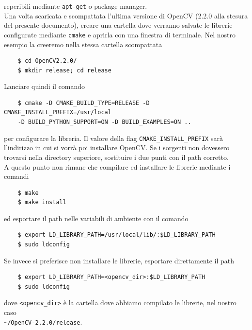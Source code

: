 \documentclass[12pt]{report}
\begin{document}
\noindent reperibili mediante \verb|apt-get| o package manager.\\

\noindent Una volta scaricata e scompattata l'ultima versione di OpenCV (2.2.0 alla stesura del presente documento), creare una cartella dove verranno salvate le librerie configurate mediante \verb|cmake| e aprirla con una finestra di terminale. Nel nostro esempio la creeremo nella stessa cartella scompattata

\begin{verbatim}
	$ cd OpenCV2.2.0/
	$ mkdir release; cd release
\end{verbatim}

\noindent Lanciare quindi il comando

\begin{verbatim}
	$ cmake -D CMAKE_BUILD_TYPE=RELEASE -D CMAKE_INSTALL_PREFIX=/usr/local
	-D BUILD_PYTHON_SUPPORT=ON -D BUILD_EXAMPLES=ON ..
\end{verbatim}

\noindent per configurare la libreria. Il valore della flag \verb|CMAKE_INSTALL_PREFIX| sar\`a l'indirizzo in cui si vorr\`a poi installare OpenCV. Se i sorgenti non dovessero trovarsi nella directory superiore, sostituire i due punti con il path corretto.\\

\noindent A questo punto non rimane che compilare ed installare le librerie mediante i comandi

\begin{verbatim}
	$ make
	$ make install
\end{verbatim}

\noindent ed esportare il path nelle variabili di ambiente con il comando

\begin{verbatim}
	$ export LD_LIBRARY_PATH=/usr/local/lib/:$LD_LIBRARY_PATH
	$ sudo ldconfig
\end{verbatim}

\noindent Se invece si preferisce non installare le librerie, esportare direttamente il path 

\begin{verbatim}
	$ export LD_LIBRARY_PATH=<opencv_dir>:$LD_LIBRARY_PATH
	$ sudo ldconfig
\end{verbatim}

\noindent dove \verb|<opencv_dir>| \`e la cartella dove abbiamo compilato le librerie, nel nostro caso\\ \verb|~/OpenCV-2.2.0/release|.
\end{document}
